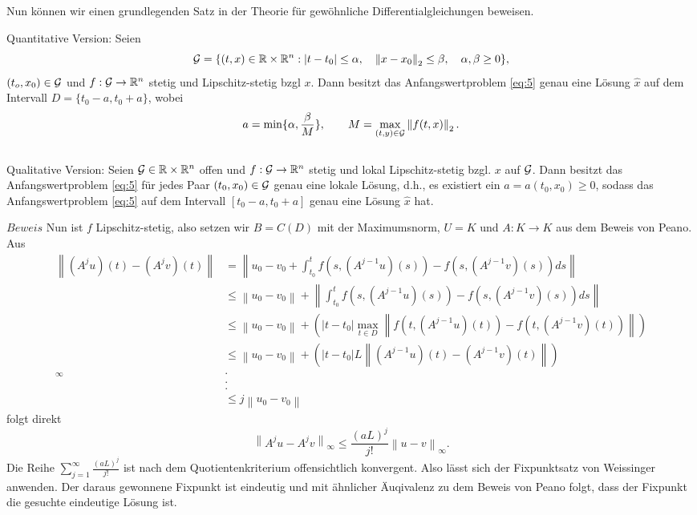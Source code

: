 Nun können wir einen grundlegenden Satz in der Theorie für gewöhnliche Differentialgleichungen beweisen.
\begin{satz}
Quantitative Version: Seien
\[
        {\cal G}=\{(t,x) \in \mathbb{R} \times \mathbb{R}^{n}: |t-t_{0}| \leq \alpha, \quad
    \left\lVert x-x_{0} \right\rVert _{2} \leq\beta, \quad \alpha,\beta \geq 0 \},
\]
$(t_{o},x_{0})\in {\cal G}$ und $f:{\cal G} \rightarrow \mathbb{R}^{n}$ stetig und Lipschitz-stetig bzgl $x$.
Dann besitzt das Anfangswertproblem \eqref{eq:5} genau eine Lösung $\hat{x}$ auf dem Intervall
$D=\{t_{0}-a,t_{0}+a\}$, wobei
\[
    a=\min\{\alpha, \frac{\beta}{M}\}, \qquad M= \max_{(t,y)\in {\cal G}}\left\lVert f(t,x)\right\rVert_{2} .
\]\\
Qualitative Version: Seien ${\cal G}\in \mathbb{R} \times \mathbb{R}^{n}$ offen und $f:{\cal G} \rightarrow \mathbb{R}^{n}$ stetig und lokal
Lipschitz-stetig bzgl. $x$ auf $\cal{G}$. Dann besitzt das Anfangswertproblem \eqref{eq:5} für jedes Paar
$(t_{0},x_{0}) \in {\cal G}$ genau eine lokale Lösung, d.h., es existiert ein $a=a(t_{0},x_{0}) \geq 0$, sodass
das Anfangswertproblem \eqref{eq:5} auf dem Intervall $[t_{0}-a,t_{0}+a]$ genau eine Lösung $\hat{x}$ hat.
\end{satz}
$Beweis$ Nun ist $f$ Lipschitz-stetig, also setzen wir $B=C(D)$ mit der Maximumsnorm, $U=K$ und $A:K \rightarrow K$
aus dem Beweis von Peano. Aus
\begin{align*}
    \left\lVert (A^j u)(t) - (A^j v)(t) \right\rVert &=
    \left\lVert u_0 - v_0 + \int_{t_0}^{t} f(s, (A^{j-1}u)(s)) - f(s, (A^{j-1}v)(s)) ds  \right\rVert \\
    &\leq \left\lVert u_0 - v_0 \right\rVert +
    \left\lVert \int_{t_0}^{t} f(s, (A^{j-1} u)(s)) - f(s, (A^{j-1} v)(s)) ds  \right\rVert \\
    &\leq \left\lVert u_0 - v_0 \right\rVert +
    (|t - t_0| \max_{t\in D} \left\lVert f(t,(A^{j-1}u)(t)) - f(t,(A^{j-1}v)(t)) \right\rVert ) \\
    &\leq \left\lVert u_0 - v_0 \right\rVert + (|t - t_0| L \left\lVert (A^{j-1}u)(t) -( A^{j-1}v)(t) \right\rVert) \\_{\infty}
    &. \\
    &. \\
    &. \\
    &\leq j \left\lVert u_0 - v_0 \right\rVert
\end{align*}
folgt direkt
\[
    \left\lVert A^j u - A^j v \right\rVert_{\infty} \leq \frac{(aL)^j}{j!} \left\lVert u - v \right\rVert_{\infty}.
\]
Die Reihe $\sum_{j=1}^{\infty} \frac{(aL)^j}{j!} $ ist nach dem Quotientenkriterium offensichtlich konvergent. Also
lässt sich der Fixpunktsatz von Weissinger anwenden. Der daraus gewonnene Fixpunkt ist eindeutig und mit ähnlicher
Äuqivalenz zu dem Beweis von Peano folgt, dass der Fixpunkt die gesuchte eindeutige Lösung ist. \qedwhite


